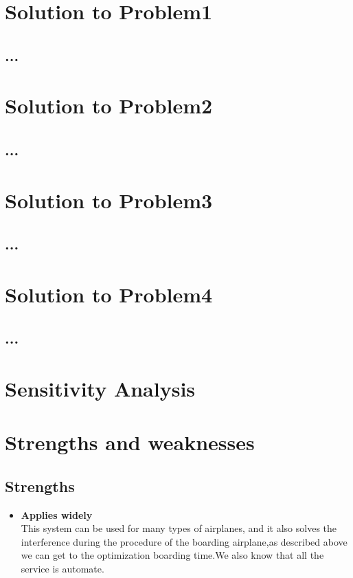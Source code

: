 \documentclass[12pt]{mcmthesis}
\begin{document}
\section{Solution to Problem1 }
\subsection{...}
\lipsum[11]
\section{Solution to Problem2}
\subsection{...}
\lipsum[6]
\section{Solution to Problem3}
\subsection{...}
\lipsum[9]
\section{Solution to Problem4}
\subsection{...}
\lipsum[6]
\section{Sensitivity Analysis}
\lipsum[6]
\section{Strengths and weaknesses}
\lipsum[12]
\subsection{Strengths}
\begin{itemize}
  \item \textbf{Applies widely}\\
        This  system can be used for many types of airplanes, and it also
        solves the interference during  the procedure of the boarding
        airplane,as described above we can get to the  optimization
        boarding time.We also know that all the service is automate.
\end{itemize}
\end{document}

